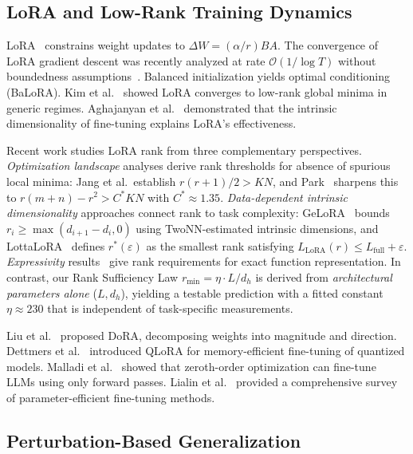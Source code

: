 \documentclass[11pt]{article}
\begin{document}
\subsection{LoRA and Low-Rank Training Dynamics}

LoRA~\cite{hu2022lora} constrains weight updates to $\Delta W = (\alpha/r)BA$. The convergence of LoRA gradient descent was recently analyzed at rate $\mathcal{O}(1/\log T)$ without boundedness assumptions~\cite{anonymous2025convergence}. Balanced initialization yields optimal conditioning (BaLoRA). Kim et al.~\cite{kim2025lora} showed LoRA converges to low-rank global minima in generic regimes. Aghajanyan et al.~\cite{aghajanyan2021intrinsic} demonstrated that the intrinsic dimensionality of fine-tuning explains LoRA's effectiveness.

Recent work studies LoRA rank from three complementary perspectives. \textit{Optimization landscape} analyses derive rank thresholds for absence of spurious local minima: Jang et al.\ establish $r(r+1)/2 > KN$, and Park~\cite{park2026rethinking} sharpens this to $r(m+n) - r^2 > C^* KN$ with $C^* \approx 1.35$. \textit{Data-dependent intrinsic dimensionality} approaches connect rank to task complexity: GeLoRA~\cite{eddib2025gelora} bounds $r_i \geq \max(d_{i+1} - d_i, 0)$ using TwoNN-estimated intrinsic dimensions, and LottaLoRA~\cite{hazan2026lottalora} defines $r^*(\varepsilon)$ as the smallest rank satisfying $L_{\text{LoRA}}(r) \leq L_{\text{full}} + \varepsilon$. \textit{Expressivity} results~\cite{zeng2024expressive} give rank requirements for exact function representation. In contrast, our Rank Sufficiency Law $r_{\min} = \eta \cdot L/d_h$ is derived from \textit{architectural parameters alone} ($L, d_h$), yielding a testable prediction with a fitted constant $\eta \approx 230$ that is independent of task-specific measurements.

Liu et al.~\cite{liu2024dora} proposed DoRA, decomposing weights into magnitude and direction. Dettmers et al.~\cite{dettmers2024qlora} introduced QLoRA for memory-efficient fine-tuning of quantized models. Malladi et al.~\cite{malladi2023fine} showed that zeroth-order optimization can fine-tune LLMs using only forward passes. Lialin et al.~\cite{lialin2023scaling} provided a comprehensive survey of parameter-efficient fine-tuning methods.

\subsection{Perturbation-Based Generalization}
\end{document}
